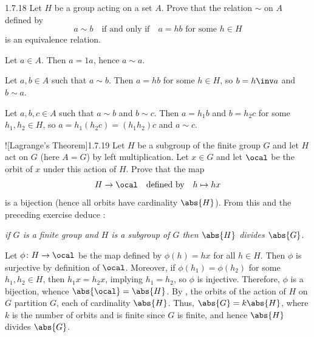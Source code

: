 \begin{exercise}{1.7.18}
    Let $H$ be a group acting on a set $A$.
	Prove that the relation $\sim$ on $A$ defined by  
    \[
    	a \sim b \quad \text{if and only if} \quad a = hb \text{ for some } h \in H
    \]
    is an equivalence relation.
\end{exercise}

\begin{solitem}
    \item Let $a \in A$.
	Then $a = 1a$, hence $a \sim a$.
    \item Let $a, b \in A$ such that $a \sim b$.
	Then $a = hb$ for some $h \in H$, so $b = h\inv a$ and $b \sim a$.
    \item Let $a, b, c \in A$ such that $a \sim b$ and $b \sim c$.
	Then $a = h_1b$ and $b = h_2c$ for some $h_1, h_2 \in H$, so $a = h_1(h_2c) = (h_1h_2)c$ and $a \sim c$.
\end{solitem}

\begin{exercise}![Lagrange's Theorem]{1.7.19}
    Let $H$ be a subgroup  of the finite group $G$ and let $H$ act on $G$ (here $A = G$) by left multiplication.
	Let $x\in G$ and let $\ocal$ be the orbit of $x$ under this action of $H$.
	Prove that the map  
    \[
    	H \to \ocal \quad \text{defined by} \quad h \mapsto hx
    \]
    is a bijection (hence all orbits have cardinality $\abs{H}$).
	From this and the preceding exercise deduce :  
    \begin{center}
        \emph{if $G$ is a finite group and $H$ is a subgroup of $G$ then $\abs{H}$ divides $\abs{G}$}.
    \end{center}
\end{exercise}

\begin{sol}
    Let $\phi \colon H \to \ocal$ be the map defined by $\phi(h) = hx$ for all $h \in H$.
    Then $\phi$ is surjective by definition of $\ocal$.
    Moreover, if $\phi(h_1) = \phi(h_2)$ for some $h_1, h_2 \in H$, then $h_1x = h_2x$, implying $h_1 = h_2$, so $\phi$ is injective.
    Therefore, $\phi$ is a bijection, whence $\abs{\ocal} = \abs{H}$.
    By , the orbits of the action of $H$ on $G$ partition $G$, each of cardinality $\abs{H}$.
    Thus, $\abs{G} = k \abs{H}$, where $k$ is the number of orbits and is finite since $G$ is finite, and hence $\abs{H}$ divides $\abs{G}$.
\end{sol}

